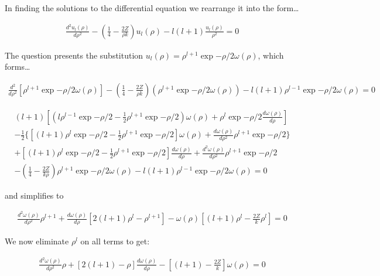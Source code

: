 \documentclass{article}
\begin{document}
    In finding the solutions to the differential equation we rearrange it into the form\dots

    \begin{gather}
        \frac{d^2u_l(\rho)}{d\rho^2} - (\frac{1}{4}-\frac{2Z}{\rho k})u_l(\rho) - l(l+1)\frac{u_l(\rho)}{\rho^2} = 0
    \end{gather}


    The question presents the substitution $u_l(\rho)=\rho^{l+1}\exp{-\rho/2}\omega(\rho)$, which forms\dots

    \begin{gather}
        \frac{d^2}{d\rho^2}[\rho^{l+1}\exp{-\rho/2}\omega(\rho)] - (\frac{1}{4}-\frac{2Z}{\rho k})(\rho^{l+1}\exp{-\rho/2}\omega(\rho))
        - l(l+1)\rho^{l-1}\exp{-\rho/2}\omega(\rho) = 0
    \end{gather}
    \medskip
    
    {\centering
    \begin{gather*}
        (l+1)[(l\rho^{l-1}\exp{-\rho/2}-\frac{1}{2}\rho^{l+1}\exp{-\rho/2})\omega(\rho) + \rho^l \exp{-\rho/2}\frac{d\omega(\rho)}{d\rho}]\\
        - \frac{1}{2}\{  [(l+1) \rho^l \exp{-\rho/2} 
        - \frac{1}{2}\rho^{l+1}\exp{-\rho/2}]\omega(\rho) 
        + \frac{d\omega(\rho)}{d\rho^2}\rho^{l+1}\exp{-\rho/2}\}\\ 
        +[(l+1)\rho^l\exp{-\rho/2}-\frac{1}{2}\rho^{l+1}\exp{-\rho/2}]\frac{d\omega(\rho)}{d\rho} + \frac{d^2\omega(\rho)}{d\rho^2}\rho^{l+1}\exp{-\rho/2}\\
        - (\frac{1}{4}-\frac{2Z}{k\rho})\rho^{l+1}\exp{-\rho/2}\omega(\rho) - l(l+1)\rho^{l-1}\exp{-\rho/2}\omega(\rho)
        = 0
    \end{gather*}
    }

    and simplifies to

    \begin{gather}
        \frac{d^2\omega(\rho)}{d\rho^2}\rho^{l+1} + \frac{d\omega(\rho)}{d\rho}[2(l+1)\rho^l - \rho^{l+1}] - \omega(\rho)[(l+1)\rho^l - \frac{2Z}{k}\rho^l]
        =0
    \end{gather}

    We now eliminate $\rho^l$ on all terms to get:

    \begin{gather}
        \frac{d^2\omega(\rho)}{d\rho^2}\rho + [2(l+1) - \rho]\frac{d\omega(\rho)}{d\rho} - [(l+1) - \frac{2Z}{k}]\omega(\rho)
        =0
    \end{gather}
    
\end{document}
